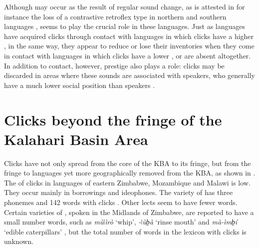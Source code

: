 \documentclass[output=paper,newtxmath,modfonts,nonflat,draftmode]{langsci/langscibook}
\begin{document}
Although  may occur as the result of regular sound change, as is attested in for instance the loss of a contrastive retroflex  type in northern and southern  languages \citep[cf.][]{Sands2010},  seems to play the crucial role in these  languages. Just as  languages have acquired clicks through contact with languages in which clicks have a higher , in the same way, they appear to reduce or lose their  inventories when they come in contact with languages in which clicks have a lower , or are absent altogether. In addition to contact, however, prestige also plays a role: clicks may be discarded in areas where these sounds are associated with  speakers, who generally have a much lower social position than  speakers \citep{Wilmsen1990}. 

\section{Clicks beyond the fringe of the Kalahari Basin Area}\label{sec:sands:4}

Clicks have not only spread from the core of the KBA to its fringe, but from the fringe to languages yet more geographically removed from the KBA, as shown in . The  of clicks in  languages of eastern Zimbabwe, Mozambique and Malawi is low. They occur mainly in borrowings and ideophones. The  variety of  has three  phonemes and 142 words with clicks \citep{Sitoe1996}. Other lects seem to have fewer  words. Certain varieties of , spoken in the Midlands of Zimbabwe, are reported to have a small number  words, such as \textit{mùǀìrò} ‘whip’, \textit{-ǀùb̤à} ‘rinse mouth’ and \textit{mà-{\textbar}ìmb̤í} ‘edible caterpillars’ \citep{Pongweni1990}, but the total number of words in the lexicon with clicks is unknown. 
\end{document}
